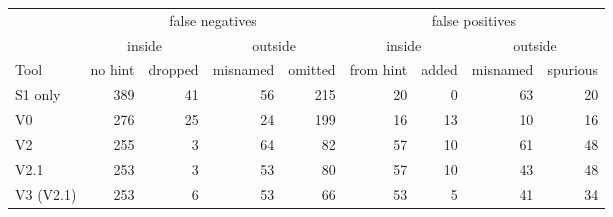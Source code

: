 \begin{tabular}{l rrrr rrrr}
\toprule
& \multicolumn{4}{c}{false negatives} & \multicolumn{4}{c}{false positives}\\
\cmidrule(lr){2-5}\cmidrule(lr){6-9}
& \multicolumn{2}{c}{inside} & \multicolumn{2}{c}{outside} & \multicolumn{2}{c}{inside} & \multicolumn{2}{c}{outside}\\
Tool & no hint & dropped & misnamed & omitted & from hint & added & misnamed & spurious\\
\midrule
S1 only & 389 & 41 & 56 & 215 & 20 & 0 & 63 & 20 \\
V0 & 276 & 25 & 24 & 199 & 16 & 13 & 10 & 16 \\
V2 & 255 & 3 & 64 & 82 & 57 & 10 & 61 & 48 \\
V2.1 & 253 & 3 & 53 & 80 & 57 & 10 & 43 & 48 \\
V3 (V2.1) & 253 & 6 & 53 & 66 & 53 & 5 & 41 & 34 \\
\bottomrule
\end{tabular}
